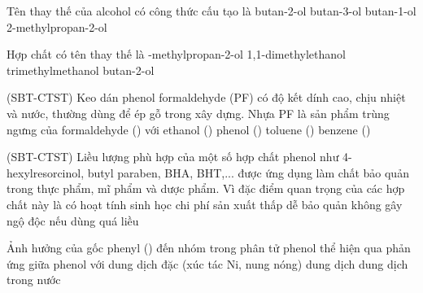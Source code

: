 \documentclass[12pt,a4paper]{article}
\begin{document}
\begin{ex}
Tên thay thế của alcohol có công thức cấu tạo  là
\choice
{\True butan-2-ol}
{butan-3-ol}
{butan-1-ol}
{2-methylpropan-2-ol}
\end{ex}

\begin{ex}
Hợp chất  có tên thay thế là
\choice
{-methylpropan-2-ol}
{1,1-dimethylethanol}
{trimethylmethanol}
{butan-2-ol}
\end{ex}

\begin{ex}
(SBT-CTST) Keo dán phenol formaldehyde (PF) có độ kết dính cao, chịu nhiệt và nước, thường dùng để ép gỗ trong xây dựng. Nhựa PF là sản phẩm trùng ngưng của formaldehyde () với
\choice
{ethanol ()}
{\True phenol ()}
{toluene ()}
{benzene ()}
\end{ex}

\begin{ex}
(SBT-CTST) Liều lượng phù hợp của một số hợp chất phenol như 4-hexylresorcinol, butyl paraben, BHA, BHT,... được ứng dụng làm chất bảo quản trong thực phẩm, mĩ phẩm và dược phẩm. Vì đặc điểm quan trọng của các hợp chất này là
\choice
{\True có hoạt tính sinh học}
{chi phí sản xuất thấp}
{dễ bảo quản}
{không gây ngộ độc nếu dùng quá liều}
\end{ex}

\begin{ex}
Ảnh hưởng của gốc phenyl () đến nhóm  trong phân tử phenol thể hiện qua phản ứng giữa phenol với
\choice
{dung dịch  đặc}
{ (xúc tác Ni, nung nóng)}
{\True dung dịch }
{dung dịch  trong nước}
\end{ex}
\end{document}
